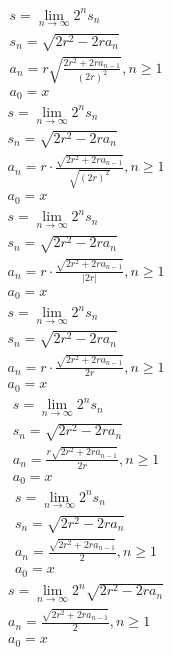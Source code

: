 \documentclass[a4paper,12pt]{report}
\begin{document}
\begin{subequations}
\begin{gather}
s = \lim \limits_{n \to \infty} 2^n s_n \\
s_n = \sqrt{2r^2 - 2ra_n} \\
a_n = r \sqrt{\frac{2r^2 + 2ra_{n-1}}{(2r)^2}}, n \geq 1 \\
a_0 = x
\end{gather}
\end{subequations}
\begin{subequations}
\begin{gather}
s = \lim \limits_{n \to \infty} 2^n s_n \\
s_n = \sqrt{2r^2 - 2ra_n} \\
a_n = r \cdot \frac{\sqrt{2r^2 + 2ra_{n-1}}}{\sqrt{(2r)^2}}, n \geq 1 \\
a_0 = x
\end{gather}
\end{subequations}
\begin{subequations}
\begin{gather}
s = \lim \limits_{n \to \infty} 2^n s_n \\
s_n = \sqrt{2r^2 - 2ra_n} \\
a_n = r \cdot \frac{\sqrt{2r^2 + 2ra_{n-1}}}{\left|2r\right|}, n \geq 1 \\
a_0 = x
\end{gather}
\end{subequations}
\begin{subequations}
\begin{gather}
s = \lim \limits_{n \to \infty} 2^n s_n \\
s_n = \sqrt{2r^2 - 2ra_n} \\
a_n = r \cdot \frac{\sqrt{2r^2 + 2ra_{n-1}}}{2r}, n \geq 1 \\
a_0 = x
\end{gather}
\end{subequations}
\begin{subequations}
\begin{gather}
s = \lim \limits_{n \to \infty} 2^n s_n \\
s_n = \sqrt{2r^2 - 2ra_n} \\
a_n = \frac{r \sqrt{2r^2 + 2ra_{n-1}}}{2r}, n \geq 1 \\
a_0 = x
\end{gather}
\end{subequations}
\begin{subequations}
\begin{gather}
s = \lim \limits_{n \to \infty} 2^n s_n \\
s_n = \sqrt{2r^2 - 2ra_n} \\
a_n = \frac{\sqrt{2r^2 + 2ra_{n-1}}}{2}, n \geq 1 \\
a_0 = x
\end{gather}
\end{subequations}
\begin{subequations}
\begin{gather}
s = \lim \limits_{n \to \infty} 2^n \sqrt{2r^2 - 2ra_n} \\
a_n = \frac{\sqrt{2r^2 + 2ra_{n-1}}}{2}, n \geq 1 \\
a_0 = x
\end{gather}
\end{subequations}
\end{document}
